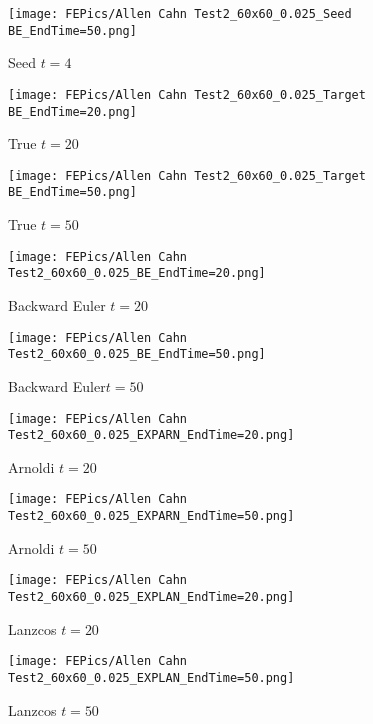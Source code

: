 \documentclass{article}
\begin{document}
\begin{figure}[H]
	\centering
	\texttt{[image: FEPics/Allen Cahn Test2\_60x60\_0.025\_Seed BE\_EndTime=50.png]}
	\caption{Seed $t=4$}
\end{figure}
\begin{figure}[H]
    \centering
    \begin{minipage}{0.5\textwidth}
       \centering
	  \texttt{[image: FEPics/Allen Cahn Test2\_60x60\_0.025\_Target BE\_EndTime=20.png]}
	  \caption{True $t=20$}
    \end{minipage}\hfill
    \begin{minipage}{0.5\textwidth}
       \centering
	  \texttt{[image: FEPics/Allen Cahn Test2\_60x60\_0.025\_Target BE\_EndTime=50.png]}
	  \caption{True $t=50$}
    \end{minipage}
\end{figure}
\begin{figure}[H]
    \centering
    \begin{minipage}{0.5\textwidth}
       \centering
	  \texttt{[image: FEPics/Allen Cahn Test2\_60x60\_0.025\_BE\_EndTime=20.png]}
	  \caption{Backward Euler $t=20$}
    \end{minipage}\hfill
    \begin{minipage}{0.5\textwidth}
       \centering
	  \texttt{[image: FEPics/Allen Cahn Test2\_60x60\_0.025\_BE\_EndTime=50.png]}
	  \caption{Backward Euler$t=50$}
    \end{minipage}
\end{figure}
\begin{figure}[H]
    \centering
    \begin{minipage}{0.5\textwidth}
       \centering
	  \texttt{[image: FEPics/Allen Cahn Test2\_60x60\_0.025\_EXPARN\_EndTime=20.png]}
	  \caption{Arnoldi $t=20$}
    \end{minipage}\hfill
    \begin{minipage}{0.5\textwidth}
       \centering
	  \texttt{[image: FEPics/Allen Cahn Test2\_60x60\_0.025\_EXPARN\_EndTime=50.png]}
	  \caption{Arnoldi $t=50$}
    \end{minipage}
\end{figure}
\begin{figure}[H]
    \centering
    \begin{minipage}{0.5\textwidth}
       \centering
	  \texttt{[image: FEPics/Allen Cahn Test2\_60x60\_0.025\_EXPLAN\_EndTime=20.png]}
	  \caption{Lanzcos $t=20$}
    \end{minipage}\hfill
    \begin{minipage}{0.5\textwidth}
       \centering
	  \texttt{[image: FEPics/Allen Cahn Test2\_60x60\_0.025\_EXPLAN\_EndTime=50.png]}
	  \caption{Lanzcos $t=50$}
    \end{minipage}
\end{figure}
\end{document}
